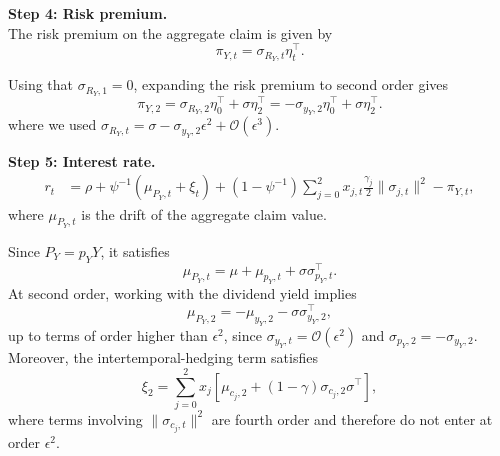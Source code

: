 \noindent\textbf{Step 4: Risk premium.}\\

The risk premium on the aggregate claim is given by
\begin{equation}
    \pi_{Y,t} = \sigma_{R_Y,t} \eta_t^\top.
\end{equation}

Using that $\sigma_{R_Y,1}=0$, expanding the risk premium to second order gives
\begin{equation}
    \pi_{Y,2} = \sigma_{R_Y,2} \eta_0^\top + \sigma \eta_2^\top = -\sigma_{y_Y,2} \eta_0^\top + \sigma \eta_2^\top.
\end{equation}
where we used $\sigma_{R_Y,t} = \sigma - \sigma_{y_Y,2}\epsilon^2 + \mathcal{O}(\epsilon^3)$.

\noindent\textbf{Step 5: Interest rate.} 
\begin{align}
    r_t &= \rho 
    + \psi^{-1} \left(\mu_{P_Y,t} + \xi_t \right)
    + (1-\psi^{-1}) \sum_{j=0}^2 x_{j,t} 
        \frac{\gamma_j}{2} \|\sigma_{j,t}\|^2
    - \pi_{Y,t},
\end{align}
where $\mu_{P_Y,t}$ is the drift of the aggregate claim value.

Since $P_Y=p_YY$, it satisfies
\begin{equation}
    \mu_{P_Y,t}=\mu+\mu_{p_Y,t}+\sigma\sigma_{p_Y,t}^\top.
\end{equation}
At second order, working with the dividend yield implies
\begin{equation}
    \mu_{P_Y,2}= -\mu_{y_Y,2}-\sigma\sigma_{y_Y,2}^\top,
\end{equation}
up to terms of order higher than $\epsilon^2$, since $\sigma_{y_Y,t}=\mathcal{O}(\epsilon^2)$ and $\sigma_{p_Y,2}=-\sigma_{y_Y,2}$.
Moreover, the intertemporal-hedging term satisfies
\begin{equation}
    \xi_2 = \sum_{j=0}^2 x_j\left[\mu_{c_j,2} + (1-\gamma)\sigma_{c_j,2}\sigma^\top\right],
\end{equation}
where terms involving $\|\sigma_{c_j,t}\|^2$ are fourth order and therefore do not enter at order $\epsilon^2$.

